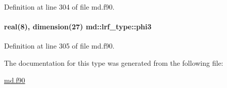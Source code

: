 Definition at line 304 of file md.\-f90.

\hypertarget{structmd_1_1lrf__type_aa982d3294206bfd7d39eb544592b8eb6}{
\paragraph[{phi3}]{\setlength{\rightskip}{0pt plus 5cm}real(8), dimension(27) md\-::lrf\-\_\-type\-::phi3}}\label{structmd_1_1lrf__type_aa982d3294206bfd7d39eb544592b8eb6}


Definition at line 305 of file md.\-f90.



The documentation for this type was generated from the following file\-:\begin{DoxyCompactItemize}
\item 
\hyperlink{md_8f90}{md.\-f90}\end{DoxyCompactItemize}
